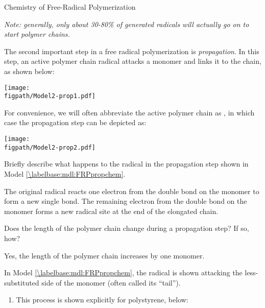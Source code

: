 \begin{activity}{Chemistry of Free-Radical Polymerization}
\begin{ctqs}
\begin{solution}[1.25in]
					\emph{Note: generally, only about 30-80\% of generated radicals will actually go on to start polymer chains.}
				\end{solution}

\end{ctqs}



\begin{model}[Propagation]
\label{\labelbase:mdl:FRPpropchem}

	The second important step in a free radical polymerization is \emph{propagation}.  In this step, an active polymer chain radical attacks a monomer and links it to the chain, as shown below:
	
			\centerline{\texttt{[image: \\figpath/Model2-prop1.pdf]}}
	
	For convenience, we will often abbreviate the active polymer chain as , in which case the propagation step can be depicted as:
	
			\centerline{\texttt{[image: \\figpath/Model2-prop2.pdf]}}
	

\end{model}

\begin{ctqs}

	\question Briefly describe what happens to the radical in the propagation step shown in Model \ref{\labelbase:mdl:FRPpropchem}.%
	
		\begin{solution}[1.5in]
			The original radical reacts one electron from the double bond on the monomer to form a new single bond.  The remaining electron from the double bond on the monomer forms a new radical site at the end of the elongated chain.
		\end{solution}
	
	\question Does the length of the polymer chain change during a propagation step?  If so, how?
	
		\begin{solution}[1.2in]
			Yes, the length of the polymer chain increases by one monomer.
		\end{solution}
	
	\question In Model \ref{\labelbase:mdl:FRPpropchem}, the radical is shown attacking the less-substituted side of the monomer (often called its ``tail'').  
	
		\begin{enumerate}
			\item This process is shown explicitly for polystyrene, below:
	

\end{enumerate}
\end{ctqs}
\end{activity}
